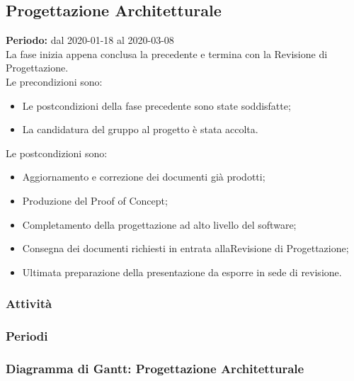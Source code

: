 \subsection{Progettazione Architetturale}

\textbf{Periodo:} dal 2020-01-18 al 2020-03-08
\\La fase inizia appena conclusa la precedente e termina con la Revisione di Progettazione.
\\Le precondizioni sono:

\begin{itemize}
    \item Le postcondizioni della fase precedente sono state soddisfatte;
    \item La candidatura del gruppo al progetto \NomeProgetto è stata accolta.
\end{itemize}
    Le postcondizioni sono:
\begin{itemize}
    \item Aggiornamento e correzione dei documenti già prodotti;
    \item Produzione del Proof of Concept;
    \item Completamento della progettazione ad alto livello del software;
    \item Consegna dei documenti richiesti in entrata allaRevisione di Progettazione;
    \item Ultimata preparazione della presentazione da esporre in sede di revisione.
\end{itemize}

\subsubsection{Attività}

\subsubsection{Periodi}

\subsubsection{Diagramma di Gantt: Progettazione Architetturale}
